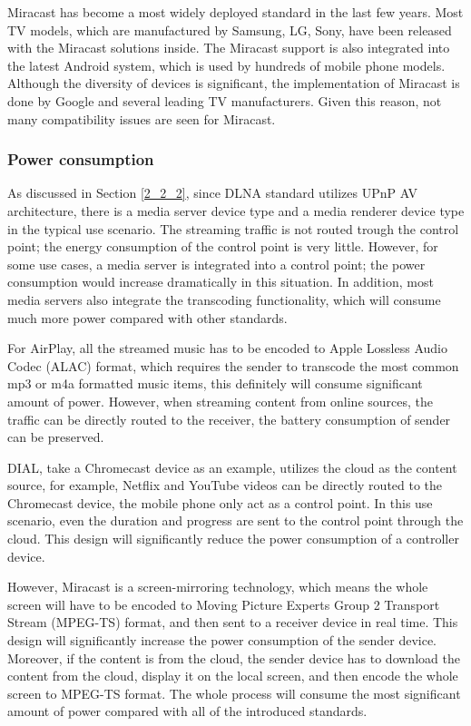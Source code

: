 Miracast has become a most widely deployed standard in the last few years. Most
TV models, which are manufactured by Samsung, LG, Sony, have been released with
the Miracast solutions inside. The Miracast support is also integrated into the
latest Android system, which is used by hundreds of mobile phone
models. Although the diversity of devices is significant, the
implementation of Miracast is done by Google and several leading TV
manufacturers. Given this reason, not many compatibility issues are seen for
Miracast.

\subsubsection{Power consumption\label{2_3_3_4}}
As discussed in Section \ref{2_2_2}, since DLNA standard utilizes UPnP AV
architecture, there is a media server device type and a media renderer device
type in the typical use scenario. The streaming traffic is not routed trough
the control point; the energy consumption of the control point is very little.
However, for some use cases, a media server is integrated into a control point;
the power consumption would increase dramatically in this situation. In
addition, most media servers also integrate the transcoding functionality,
which will consume much more power compared with other standards.

For AirPlay, all the streamed music has to be encoded to Apple
Lossless Audio Codec (ALAC) format, which requires the sender to transcode the
most common mp3 or m4a formatted music items, this definitely will consume
significant amount of power. However, when streaming content from online
sources, the traffic can be directly routed to the receiver, the battery
consumption of sender can be preserved.

DIAL, take a Chromecast device as an example, utilizes the cloud as the content
source, for example, Netflix and YouTube videos can be directly routed to the
Chromecast device, the mobile phone only act as a control point.
In this use scenario, even the duration and progress are sent to the control
point through the cloud. This design will significantly reduce the power
consumption of a controller device.

However, Miracast is a screen-mirroring technology, which means the whole
screen will have to be encoded to Moving Picture Experts Group 2 Transport
Stream (MPEG-TS) format, and then sent to a receiver device in real time. This
design will significantly increase the power consumption of the sender device.
Moreover, if the content is from the cloud, the sender device has to download
the content from the cloud, display it on the local screen, and then encode the
whole screen to MPEG-TS format. The whole process will consume the most
significant amount of power compared with all of the introduced standards.

